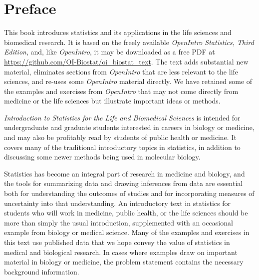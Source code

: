 

\chapter*{Preface}


This book introduces statistics and its applications in the life sciences and biomedical research.  It is based on the freely available \textsl{OpenIntro Statistics, Third Edition}, and, like \textsl{OpenIntro}, it may be downloaded as a free PDF at \url{https://github.com/OI-Biostat/oi_biostat_text}.  The text adds substantial new material, eliminates sections from \textsl{OpenIntro} that are less relevant to the life sciences, and re-uses some \textsl{OpenIntro} material directly. We have retained some of the examples and exercises from \textsl{OpenIntro} that may not come directly from medicine or the life sciences but illustrate important ideas or methods. 

\textsl{Introduction to Statistics for the Life and Biomedical Sciences} is intended for undergraduate and graduate students interested in careers in biology or medicine, and may also be profitably read by students of public health or medicine.  It covers many of the traditional introductory topics in statistics, in addition to discussing some newer methods being used in molecular biology. 

Statistics has become an integral part of research in medicine and biology, and the tools for summarizing data and drawing inferences from data are essential both for understanding the outcomes of studies and for incorporating measures of uncertainty into that understanding.  An introductory text in statistics for students who will work in medicine, public health, or the life sciences should be more than simply the usual introduction, supplemented with an occasional example from biology or medical science. Many of the examples and exercises in this text use published data that we hope convey the value of statistics in medical and biological research. In cases where examples draw on important material in biology or medicine, the problem statement contains the necessary background information. 

